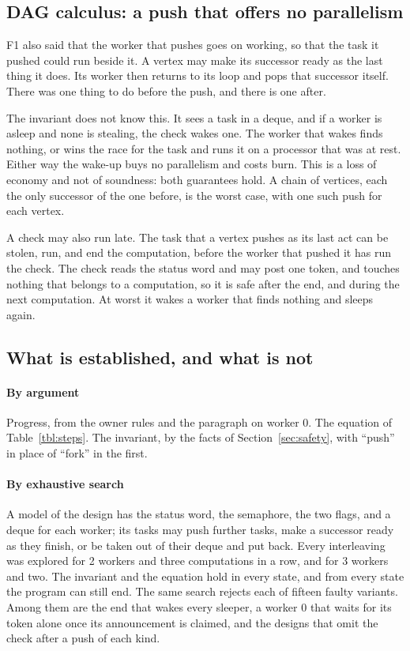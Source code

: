 \documentclass[sigplan,nonacm]{acmart}
\begin{document}
\subsection{DAG calculus: a push that offers no parallelism}

F1 also said that the worker that pushes goes on working, so that the
task it pushed could run beside it.
%
A vertex may make its successor ready as the last thing it does.
%
Its worker then returns to its loop and pops that successor itself.
%
There was one thing to do before the push, and there is one after.

The invariant does not know this.
%
It sees a task in a deque, and if a worker is asleep and none is
stealing, the check wakes one.
%
The worker that wakes finds nothing, or wins the race for the task
and runs it on a processor that was at rest.
%
Either way the wake-up buys no parallelism and costs burn.
%
This is a loss of economy and not of soundness: both guarantees hold.
%
A chain of vertices, each the only successor of the one before, is
the worst case, with one such push for each vertex.

A check may also run late.
%
The task that a vertex pushes as its last act can be stolen, run, and
end the computation, before the worker that pushed it has run the
check.
%
The check reads the status word and may post one token, and touches
nothing that belongs to a computation, so it is safe after the end,
and during the next computation.
%
At worst it wakes a worker that finds nothing and sleeps again.

\subsection{What is established, and what is not}

\paragraph{By argument}
%
Progress, from the owner rules and the paragraph on worker 0.
%
The equation of Table~\ref{tbl:steps}.
%
The invariant, by the facts of Section~\ref{sec:safety}, with
``push'' in place of ``fork'' in the first.

\paragraph{By exhaustive search}
%
A model of the design has the status word, the semaphore, the two
flags, and a deque for each worker; its tasks may push further
tasks, make a successor ready as they finish, or be taken out of
their deque and put back.
%
Every interleaving was explored for 2 workers and three computations
in a row, and for 3 workers and two.
%
The invariant and the equation hold in every state, and from every
state the program can still end.
%
The same search rejects each of fifteen faulty variants.
%
Among them are the end that wakes every sleeper, a worker 0 that
waits for its token alone once its announcement is claimed, and the
designs that omit the check after a push of each kind.
\end{document}
